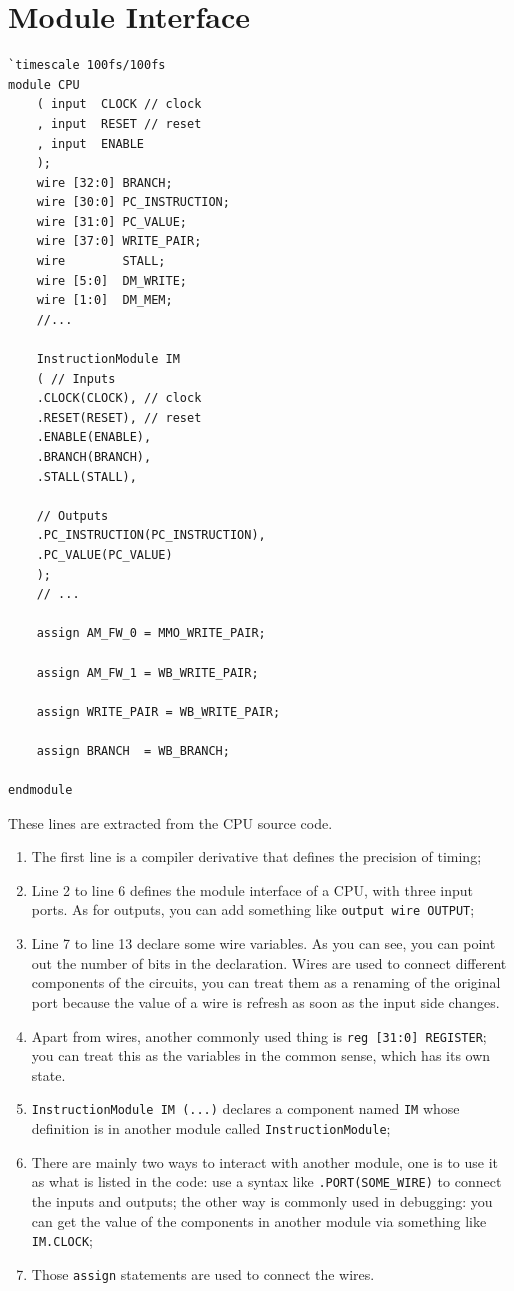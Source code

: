 \documentclass[a4paper,12pt, oneside]{book}
\begin{document}
\section{Module Interface}
\begin{verbatim}
`timescale 100fs/100fs
module CPU 
    ( input  CLOCK // clock
    , input  RESET // reset
    , input  ENABLE
    );
    wire [32:0] BRANCH;
    wire [30:0] PC_INSTRUCTION;
    wire [31:0] PC_VALUE;
    wire [37:0] WRITE_PAIR;
    wire        STALL;
    wire [5:0]  DM_WRITE;
    wire [1:0]  DM_MEM;
    //...

    InstructionModule IM
    ( // Inputs
    .CLOCK(CLOCK), // clock
    .RESET(RESET), // reset
    .ENABLE(ENABLE),
    .BRANCH(BRANCH),
    .STALL(STALL),

    // Outputs
    .PC_INSTRUCTION(PC_INSTRUCTION),
    .PC_VALUE(PC_VALUE)
    );
    // ...

    assign AM_FW_0 = MMO_WRITE_PAIR;

    assign AM_FW_1 = WB_WRITE_PAIR;

    assign WRITE_PAIR = WB_WRITE_PAIR;

    assign BRANCH  = WB_BRANCH;
    
endmodule
\end{verbatim}
These lines are extracted from the CPU source code. 
\begin{enumerate}
	\item The first line is a compiler derivative that defines the precision of timing;
	\item Line 2 to line 6 defines the module interface of a CPU, with three input ports. As for outputs, you can add something like \texttt{output wire OUTPUT};
	\item Line 7 to line 13 declare some wire variables. As you can see, you can point out the number of bits in the declaration. Wires are used to connect different components of the circuits, you can treat them as a renaming of the original port because the value of a wire is refresh as soon as the input side changes.
	\item Apart from wires, another commonly used thing is \texttt{reg [31:0] REGISTER}; you can treat this as the variables in the common sense, which has its own state.
	\item \texttt{InstructionModule IM (...)} declares a component named \texttt{IM} whose definition is in another module called \texttt{InstructionModule};
	\item There are mainly two ways to interact with another module, one is to use it as what is listed in the code: use a syntax like \texttt{.PORT(SOME_WIRE)} to connect the inputs and outputs; the other way is commonly used in debugging: you can get the value of the components in another module via something like \texttt{IM.CLOCK};
	\item Those \texttt{assign} statements are used to connect the wires.
\end{enumerate}
\end{document}
